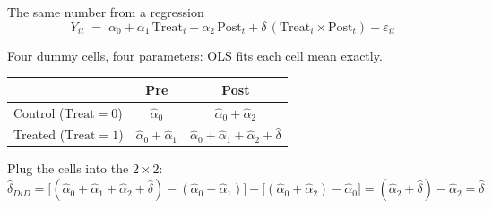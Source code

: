 \documentclass[
  11pt,
  ignorenonframetext,
  aspectratio=169,
]{beamer}
\begin{document}
\begin{frame}{The same number from a regression}
\protect{}\label{the-same-number-from-a-regression}
\[
Y_{it} \;=\; \alpha_0 + \alpha_1\,\text{Treat}_i + \alpha_2\,\text{Post}_t + \delta\,(\text{Treat}_i \times \text{Post}_t) + \varepsilon_{it}
\]

Four dummy cells, four parameters: OLS fits each cell mean exactly.

\begin{center}\small
\begin{tabular}{lcc}
\toprule
 & Pre & Post \\
\midrule
Control ($\text{Treat}=0$) & $\hat\alpha_0$ & $\hat\alpha_0 + \hat\alpha_2$ \\
Treated ($\text{Treat}=1$) & $\hat\alpha_0 + \hat\alpha_1$ & $\hat\alpha_0 + \hat\alpha_1 + \hat\alpha_2 + \hat\delta$ \\
\bottomrule
\end{tabular}
\end{center}

Plug the cells into the \(2 \times 2\): \[
\hat\delta_{DiD} = \big[(\hat\alpha_0 + \hat\alpha_1 + \hat\alpha_2 + \hat\delta) - (\hat\alpha_0 + \hat\alpha_1)\big] - \big[(\hat\alpha_0 + \hat\alpha_2) - \hat\alpha_0\big] = (\hat\alpha_2 + \hat\delta) - \hat\alpha_2 = \hat\delta
\]
\end{frame}
\end{document}
